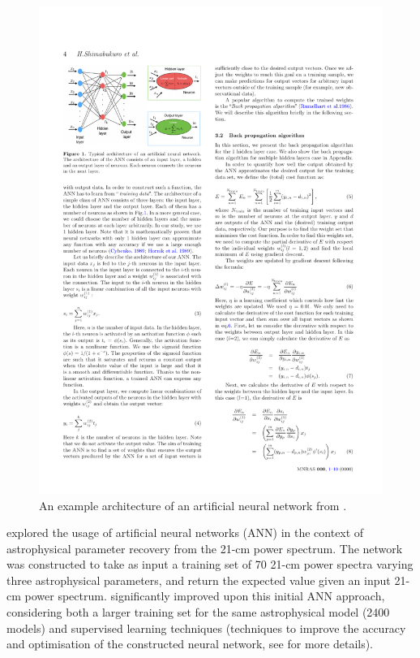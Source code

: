 \begin{figure}[]
\begin{center}
\includegraphics[trim = 0.2cm 1cm 0.2cm 0.2cm, scale = 1.20]{Greig/ANNexample}
\end{center}
\caption{An example architecture of an artificial neural network from \cite{Shimabukuro:2017b}.}
\label{fig:ANN}
\end{figure}

\cite{Shimabukuro:2017b} explored the usage of artificial neural networks (ANN) in the context of astrophysical parameter recovery from the 21-cm power spectrum. The network was constructed to take as input a training set of 70 21-cm power spectra varying three astrophysical parameters, and return the expected value given an input 21-cm power spectrum. \cite{Doussot:2019} significantly improved upon this initial ANN approach, considering both a larger training set for the same astrophysical model (2400 models) and supervised learning techniques (techniques to improve the accuracy and optimisation of the constructed neural network, see \cite{Doussot:2019} for more details).

